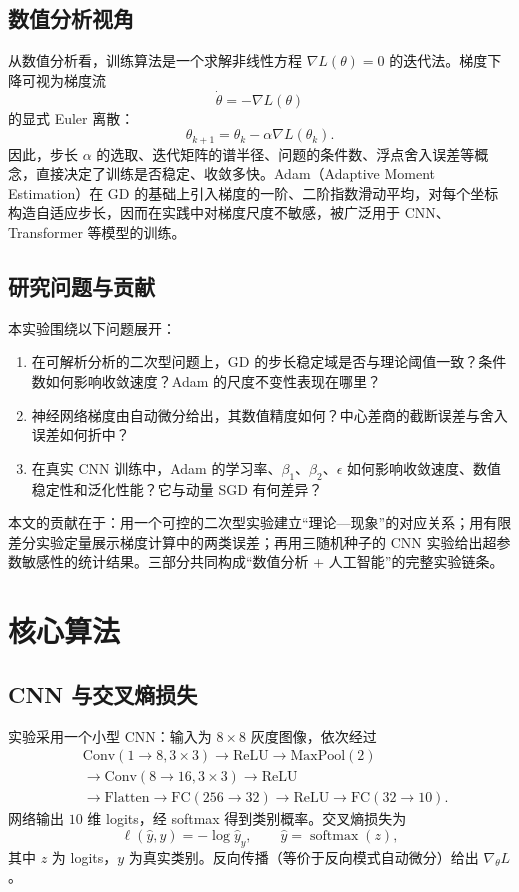\documentclass[12pt,a4paper]{ctexart}
\begin{document}
\subsection{数值分析视角}
从数值分析看，训练算法是一个求解非线性方程 $\nabla L(\theta)=0$ 的迭代法。梯度下降可视为梯度流
\begin{equation}
\dot\theta=-\nabla L(\theta)
\end{equation}
的显式 Euler 离散：
\begin{equation}
\theta_{k+1}=\theta_k-\alpha\nabla L(\theta_k).
\end{equation}
因此，步长 $\alpha$ 的选取、迭代矩阵的谱半径、问题的条件数、浮点舍入误差等概念，直接决定了训练是否稳定、收敛多快。Adam（Adaptive Moment Estimation）在 GD 的基础上引入梯度的一阶、二阶指数滑动平均，对每个坐标构造自适应步长，因而在实践中对梯度尺度不敏感，被广泛用于 CNN、Transformer 等模型的训练。

\subsection{研究问题与贡献}
本实验围绕以下问题展开：
\begin{enumerate}[label=(\arabic*),itemsep=0.3em]
\item 在可解析分析的二次型问题上，GD 的步长稳定域是否与理论阈值一致？条件数如何影响收敛速度？Adam 的尺度不变性表现在哪里？
\item 神经网络梯度由自动微分给出，其数值精度如何？中心差商的截断误差与舍入误差如何折中？
\item 在真实 CNN 训练中，Adam 的学习率、$\beta_1$、$\beta_2$、$\epsilon$ 如何影响收敛速度、数值稳定性和泛化性能？它与动量 SGD 有何差异？
\end{enumerate}

本文的贡献在于：用一个可控的二次型实验建立“理论—现象”的对应关系；用有限差分实验定量展示梯度计算中的两类误差；再用三随机种子的 CNN 实验给出超参数敏感性的统计结果。三部分共同构成“数值分析 + 人工智能”的完整实验链条。

\section{核心算法}

\subsection{CNN 与交叉熵损失}
实验采用一个小型 CNN：输入为 $8\times8$ 灰度图像，依次经过
\[
\begin{aligned}
&\text{Conv}(1\to8,3\times3)\to\text{ReLU}\to\text{MaxPool}(2)\\
&\to\text{Conv}(8\to16,3\times3)\to\text{ReLU}\\
&\to\text{Flatten}\to\text{FC}(256\to32)\to\text{ReLU}\to\text{FC}(32\to10).
\end{aligned}
\]
网络输出 $10$ 维 logits，经 softmax 得到类别概率。交叉熵损失为
\begin{equation}
\ell(\hat y,y)=-\log \hat y_y,\qquad
\hat y=\operatorname{softmax}(z),
\end{equation}
其中 $z$ 为 logits，$y$ 为真实类别。反向传播（等价于反向模式自动微分）给出 $\nabla_\theta L$。
\end{document}
